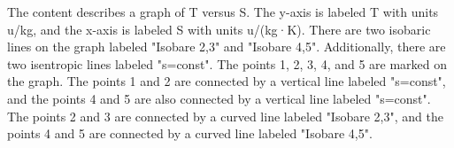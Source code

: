 The content describes a graph of T versus S. The y-axis is labeled T with units u/kg, and the x-axis is labeled S with units u/(kg·K). There are two isobaric lines on the graph labeled "Isobare 2,3" and "Isobare 4,5". Additionally, there are two isentropic lines labeled "s=const". The points 1, 2, 3, 4, and 5 are marked on the graph. The points 1 and 2 are connected by a vertical line labeled "s=const", and the points 4 and 5 are also connected by a vertical line labeled "s=const". The points 2 and 3 are connected by a curved line labeled "Isobare 2,3", and the points 4 and 5 are connected by a curved line labeled "Isobare 4,5".